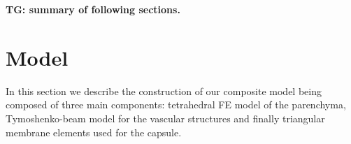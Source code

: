 \documentclass{llncs}
\newcommand{\TG}[1]{{\color{blue}\textbf{TG: #1}}}
\begin{document}
%
%
%
%

\TG{summary of following sections.}



\section{Model} %

In this section we describe the construction of our composite model
being composed of three main components: tetrahedral FE model of the 
parenchyma, Tymoshenko-beam model for the vascular structures and finally 
triangular membrane elements used for the capsule.
\end{document}
